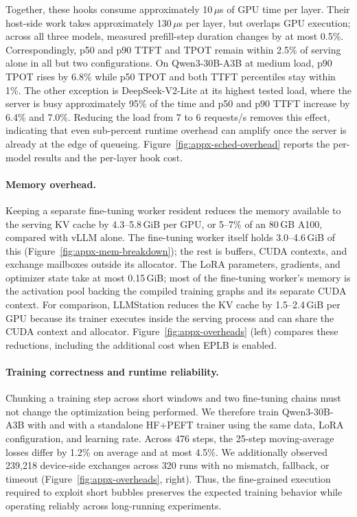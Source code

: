 Together, these hooks consume approximately 10\,$\mu$s of GPU time
per layer. Their host-side work takes approximately 130\,$\mu$s per
layer, but overlaps GPU execution; across all three models, measured
prefill-step duration changes by at most 0.5\%. Correspondingly, p50
and p90 \ac{TTFT} and \ac{TPOT} remain within 2.5\% of serving alone
in all but two configurations. On Qwen3-30B-A3B at medium load, p90
\ac{TPOT} rises by 6.8\% while p50 \ac{TPOT} and both \ac{TTFT}
percentiles stay within 1\%. The other exception is
DeepSeek-V2-Lite at its highest tested load, where the server is busy
approximately 95\% of the time and p50 and p90 \ac{TTFT} increase by
6.4\% and 7.0\%. Reducing the load from 7 to 6 requests/s removes this effect,
indicating that even sub-percent runtime overhead can amplify once the
server is already at the edge of queueing.
Figure~\ref{fig:appx-sched-overhead} reports the per-model results and
the per-layer hook cost.

\paragraph{Memory overhead.}
Keeping a separate fine-tuning worker resident reduces the memory available to the
serving KV cache by 4.3--5.8\,GiB per GPU, or 5--7\% of an 80\,GB A100,
compared with vLLM alone. The fine-tuning worker itself holds 3.0--4.6\,GiB
of this (Figure~\ref{fig:appx-mem-breakdown}); the rest is buffers,
CUDA contexts, and exchange mailboxes outside its allocator. The LoRA
parameters, gradients, and optimizer state take at most 0.15\,GiB;
most of the fine-tuning worker's memory is the activation pool backing the
compiled training graphs and its separate CUDA context. For comparison,
LLMStation reduces the KV cache by 1.5--2.4\,GiB per GPU because its
trainer executes inside the serving process and can share the CUDA
context and allocator. Figure~\ref{fig:appx-overheads} (left) compares
these reductions, including the additional cost when \ac{EPLB} is
enabled.

\paragraph{Training correctness and runtime reliability.}
\label{appendix:correctness}
Chunking a training step across short windows and two fine-tuning chains
must not change the optimization being performed. We therefore train
Qwen3-30B-A3B with \sys{} and with a standalone HF+PEFT trainer using
the same data, LoRA configuration, and learning rate. Across 476
steps, the 25-step moving-average losses differ by 1.2\% on average
and at most 4.5\%. We additionally observed 239,218 device-side
exchanges across 320 \sys{} runs with no mismatch, fallback, or
timeout (Figure~\ref{fig:appx-overheads}, right). Thus, the fine-grained execution required to exploit short
bubbles preserves the expected training behavior while
operating reliably across long-running experiments.
